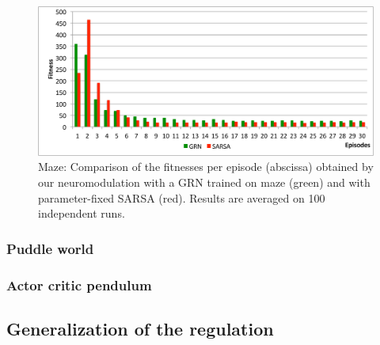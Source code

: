 \begin{figure}
\center
\includegraphics[width=\linewidth]{MZ_GRNvsSARSA.pdf}
\caption{Maze: Comparison of the fitnesses per episode (abscissa) obtained by our neuromodulation with a GRN trained on maze (green) and with parameter-fixed SARSA (red). Results are averaged on 100 independent runs.}\label{fig:MC:GRNvsSARSA}
\end{figure}


\subsubsection{Puddle world}

\subsubsection{Actor critic pendulum}

\subsection{Generalization of the regulation}